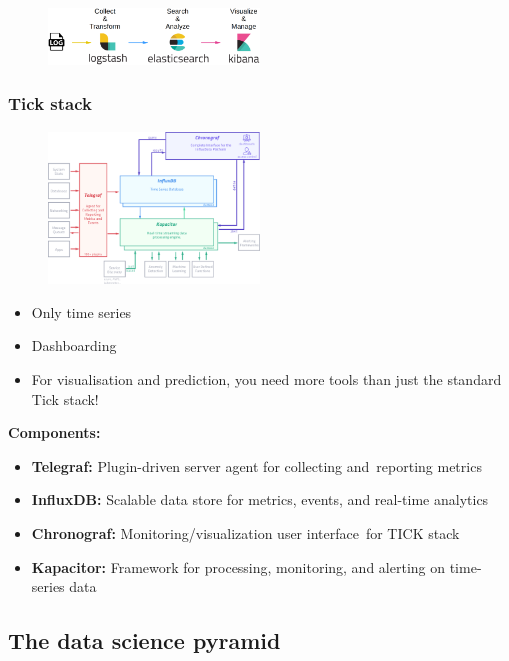 \documentclass{article}
\begin{document}
\begin{figure}[H]
    \centering
    \includegraphics[width=0.5\textwidth]{elastic-stack.png}
\end{figure}

\subsubsection{Tick stack}

\begin{figure}[H]
    \centering
    \includegraphics[width=0.5\textwidth]{tick-stack.png}
\end{figure}

\begin{itemize}
    \item Only time series
    \item Dashboarding
    \item For visualisation and prediction, you need more tools than just the standard Tick stack!
\end{itemize}

\textbf{Components:}

\begin{itemize}
    \item \textbf{Telegraf:} Plugin-driven server agent for collecting and reporting metrics
    \item \textbf{InfluxDB:} Scalable data store for metrics, events, and real-time analytics
    \item \textbf{Chronograf:} Monitoring/visualization user interface for TICK stack
    \item \textbf{Kapacitor:} Framework for processing, monitoring, and alerting on time-series data
\end{itemize}

\subsection{The data science pyramid}
\end{document}

